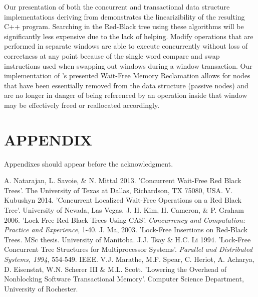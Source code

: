 \documentclass[letterpaper, 10 pt, conference]{ieeeconf}
\begin{document}
	Our presentation of both the concurrent and transactional data structure implementations deriving from \cite{1} demonstrates the linearizibility of the resulting C++ program. Searching in the Red-Black tree using these algorithms will be significantly less expensive due to the lack of helping. Modify operations that are performed in separate windows are able to execute concurrently without loss of correctness at any point because of the single word compare and swap instructions used when swapping out windows during a window transaction. Our implementation of \cite{1}'s presented Wait-Free Memory Reclamation allows for nodes that have been essentially removed from the data structure (passive nodes) and are no longer in danger of being referenced by an operation inside that window may be effectively freed or reallocated accordingly.

	
	\section*{APPENDIX}
	
	Appendixes should appear before the acknowledgment.
	
	\begin{thebibliography}{99}
		
		 A. Natarajan, L. Savoie, \& N. Mittal 2013. 'Concurrent Wait-Free Red Black Trees'. The University of Texas at Dallas, Richardson, TX 75080, USA.
		 V. Kubushyn 2014. 'Concurrent Localized Wait-Free Operations on a Red Black Tree'. University of Nevada, Las Vegas.
		 J. H. Kim, H. Cameron, \& P. Graham 2006. 'Lock-Free Red-Black Trees Using CAS'. \textit{Concurrency and Computation: Practice and Experience}, 1-40.
		 J. Ma, 2003. 'Lock-Free Insertions on Red-Black Trees. MSc thesis. University of Manitoba.
		 J.J. Tsay \& H.C. Li 1994. 'Lock-Free Concurrent Tree Structures for Multiprocessor Systems'. \textit{Parallel and Distributed Systems, 1994}, 554-549. IEEE.
		 V.J. Marathe, M.F. Spear, C. Heriot, A. Acharya, D. Eisenstat, W.N. Scherer III \& M.L. Scott. 'Lowering the Overhead of Nonblocking Software Transactional Memory'. Computer Science Department, University of Rochester.
		
	\end{thebibliography}
	
	
	
	
\end{document}
